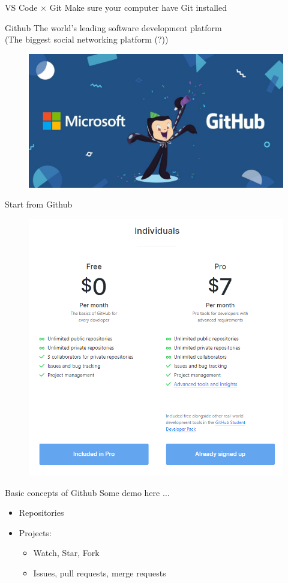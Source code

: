 \documentclass{../TexTemplate/myslide}
\begin{document}
\begin{frame}{VS Code $\times$ Git}
Make sure your computer have Git installed
\end{frame}

\begin{frame}{Github}
The world's leading software development platform\\
(The biggest social networking platform (?))
\begin{figure}
\centering
\includegraphics[width=0.8\linewidth]{fig/microsoft-github-celebrate.jpg}
\end{figure}
\end{frame}

\begin{frame}{Start from Github}
\begin{figure}
\centering
\includegraphics[width=0.8\linewidth]{fig/github_price.png}
\end{figure}
\end{frame}

\begin{frame}{Basic concepts of Github}
Some demo here $\ldots$
\begin{itemize}
	\item Repositories
	\item Projects:
	\begin{itemize}
		\item Watch, Star, Fork
		\item Issues, pull requests, merge requests
	\end{itemize}
\end{itemize}
\end{frame}
\end{document}
